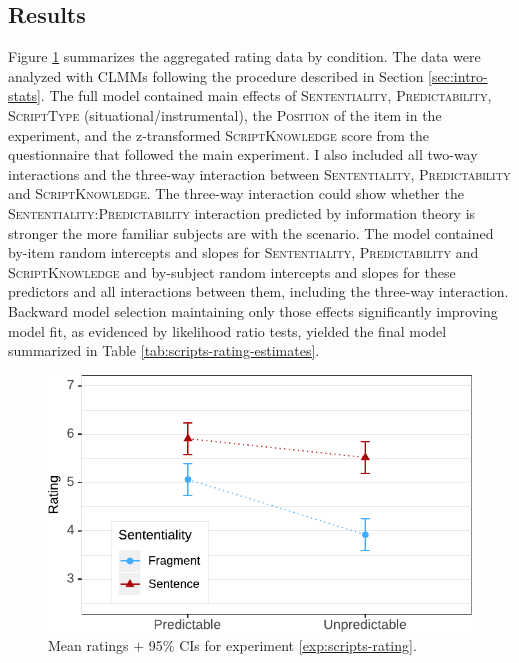 \subsection{Results}
Figure \ref{fig:scripts-rating-means} summarizes the aggregated rating data by condition. The data were analyzed with CLMMs following the procedure described in Section \ref{sec:intro-stats}. The full model contained main effects of \textsc{Sententiality}, \textsc{Predictability}, \textsc{ScriptType} (situational/instrumental), the \textsc{Position} of the item in the experiment, and the z-transformed \textsc{ScriptKnowledge} score from the questionnaire that followed the main experiment. I also included all two-way interactions and the three-way interaction between \textsc{Sententiality}, \textsc{Predictability} and \textsc{ScriptKnowledge}. The three-way interaction could show whe\-ther the \textsc{Sententiali\-ty:Predicta\-bility} interaction predicted by information theory is stronger the more familiar subjects are with the scenario. The model contained by-item random intercepts and slopes for \textsc{Sententiality}, \textsc{Predictability} and \textsc{ScriptKnow\-ledge} and by-subject random intercepts and slopes for these predictors and all interactions between them, including the three-way interaction. Backward model selection maintaining only those effects significantly improving model fit, as evidenced by likelihood ratio tests, yielded the final model summarized in Table \ref{tab:scripts-rating-estimates}. 

\begin{figure}
\includegraphics[scale=1]{figures/scr_rating_estimates}
 \caption{Mean ratings $+$ 95\% CIs for experiment \ref{exp:scripts-rating}. \label{fig:scripts-rating-means}}
\end{figure}

